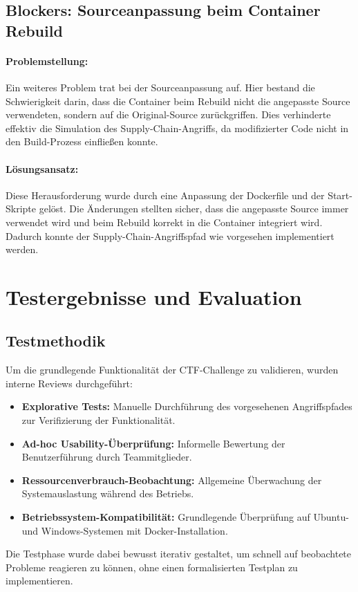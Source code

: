 \documentclass[12pt]{scrartcl}
\begin{document}
        \subsection{Blockers: Sourceanpassung beim Container Rebuild}

        \paragraph{Problemstellung:}
        Ein weiteres Problem trat bei der Sourceanpassung auf. Hier bestand die Schwierigkeit darin, dass die Container beim Rebuild nicht die angepasste Source verwendeten, sondern auf die Original-Source zurückgriffen. Dies verhinderte effektiv die Simulation des Supply-Chain-Angriffs, da modifizierter Code nicht in den Build-Prozess einfließen konnte.
        
        \paragraph{Lösungsansatz:}
        Diese Herausforderung wurde durch eine Anpassung der Dockerfile und der Start-Skripte gelöst. Die Änderungen stellten sicher, dass die angepasste Source immer verwendet wird und beim Rebuild korrekt in die Container integriert wird. Dadurch konnte der Supply-Chain-Angriffspfad wie vorgesehen implementiert werden.

    \newpage

    \section{Testergebnisse und Evaluation}

    \subsection{Testmethodik}
    
    Um die grundlegende Funktionalität der CTF-Challenge zu validieren, wurden interne Reviews durchgeführt:
    
    \begin{itemize}
        \item \textbf{Explorative Tests:} Manuelle Durchführung des vorgesehenen Angriffspfades zur Verifizierung der Funktionalität.
        
        \item \textbf{Ad-hoc Usability-Überprüfung:} Informelle Bewertung der Benutzerführung durch Teammitglieder.
        
        \item \textbf{Ressourcenverbrauch-Beobachtung:} Allgemeine Überwachung der Systemauslastung während des Betriebs.
        
        \item \textbf{Betriebssystem-Kompatibilität:} Grundlegende Überprüfung auf Ubuntu- und Windows-Systemen mit Docker-Installation.
    \end{itemize}
    \noindent
    Die Testphase wurde dabei bewusst iterativ gestaltet, um schnell auf beobachtete Probleme reagieren zu können, ohne einen formalisierten Testplan zu implementieren.
    
\end{document}
